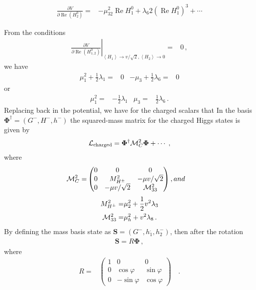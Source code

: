 \begin{align}
  \frac{\partial V}{\partial \operatorname{Re}\left( H_2^{0} \right)}=&
-\mu^2_32\operatorname{Re}H_1^0+\lambda_6 2  \left(\operatorname{Re}H_1^0 \right)^3+\cdots
\end{align}

From the conditions
\begin{align}
  \left.   \frac{\partial V}{\partial \operatorname{Re}\left( H_{1,2}^{0} \right)} \right|_{\left\langle H_1  \right\rangle \to v/\sqrt{2},\left\langle H_2  \right\rangle \to 0}=&0\,,
\end{align}
we have
\begin{align}
  \mu_1^2+\frac{1}{2} \lambda_1 =&0 &-\mu_3+\frac{1}{2}\lambda_6=&0
\end{align}
or
\begin{align}
   \mu_1^2=&-\frac{1}{2} \lambda_1  &\mu_3=&\frac{1}{2}\lambda_6\,.
\end{align}
Replacing back in the potential, we have for the charged scalars that
In the basis $\mathbf{\Phi}^{\dagger}=(G^{-}, 
H^{-}, h^{-})$ 
the squared-mass matrix for the charged Higgs states is given by
\begin{align}
  \label{eq:scalarM}
\mathcal{L}_{\text{charged}}= \boldsymbol{\Phi}^{\dagger} {\cal M}_{C}^{2}\boldsymbol{\Phi}+\cdots\;,
\end{align}
where 
\begin{align}
  {\cal M}_{C}^{2}=&
  \begin{pmatrix}
    0   &          0         &  0                   \\
    0   &  M_{H^{\pm}}^{2}   &  -\mu v/\sqrt{2}     \\
    0       &  -\mu v/\sqrt{2} &  {\cal M}_{33}^{2}   
  \end{pmatrix},
and
\end{align}
\begin{align}
  \label{eq:entriesofmassmatrix}
  M_{H^{\pm}}^{2} =& \mu_{2}^{2} +\frac{1}{2}v^{2}\lambda_{3}
  \nonumber\\
  {\cal M}_{33}^{2} =& \mu_{h}^{2} + v^{2}\lambda_{8}\,.
\end{align}
By defining the mass basis state as $\mathbf{S}=\left( G^-,h_1^.,h_2^- \right)$, then after the rotation
\begin{align}
\mathbf{S}=R \boldsymbol{\Phi}\,,
\end{align}
where
\begin{align}
    \label{eq:rotationM}
  R =& 
  \begin{pmatrix}
    1 &      0       &     0       \\
    0 & \cos\varphi  &  \sin\varphi\\
    0 & -\sin\varphi &  \cos\varphi
  \end{pmatrix}&\,.
\end{align}

